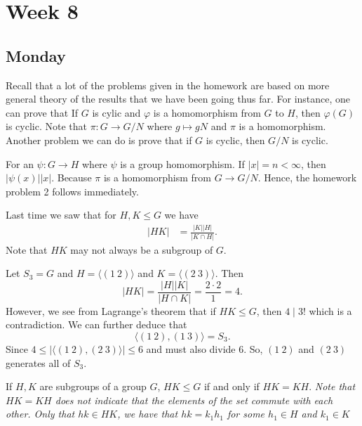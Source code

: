 \section{Week 8}

\subsection{Monday}

Recall that a lot of the problems given in the homework are based on more general theory of the results that we have been going thus far. For instance, one can prove that 
If \( G  \) is cylic and \( \varphi  \) is a homomorphism from \( G  \) to \( H  \), then \( \varphi(G)  \) is cyclic. Note that \( \pi : G \to G / N  \) where \( g \mapsto gN \)   and \( \pi  \) is a homomorphism. Another problem we can do is prove that if \( G  \) is cyclic, then \( G / N  \) is cyclic. 

For an \( \psi  : G \to H  \) where \( \psi  \) is a group homomorphism. If \( | x  |  =  n < \infty   \), then \( | \psi(x)  | | x  |  \). Because \( \pi  \) is a homomorphism from \( G \to G / N  \). Hence, the homework problem 2 follows immediately.

Last time we saw that for \( H , K \leq G  \) we have 
\begin{align*}
    | H K  |  &= \frac{ | K  |  | H  |  }{  | K \cap  H |  }.
\end{align*}
Note that \( HK  \) may not always be a subgroup of \( G  \).

\begin{eg}
   Let \( {S}_{3} = G  \) and \( H = \langle (1 \ 2) \rangle \) and \( K = \langle  (2 \ 3) \rangle \). Then 
   \[  | H K |  = \frac{ | H  |  | K  |   }{ | H \cap K  |  }  = \frac{ 2 \cdot 2  }{ 1  }  = 4.  \]
   However, we see from Lagrange's theorem that if \( H K \leq G  \), then \( 4 \mid 3!  \) which is a contradiction. We can further deduce that 
   \[  \langle (1  \ 2 )  , (1 \  3) \rangle = {S}_{3}. \]
   Since \( 4 \leq | \langle (1  \  2 ) , (2 \ 3) \rangle | \leq 6  \) and must also divide \( 6  \). So, \( (1 \ 2) \) and \( (2 \ 3 ) \) generates all of \( {S}_{3} \).
\end{eg}

\begin{prop}
   If \( H, K  \) are subgroups of a group \( G  \), \( H K \leq G  \) if and only if \( HK =KH  \).
   \textit{Note that \( HK = KH  \) does not indicate that the elements of the set commute with each other. Only that \( h k  \in H K \), we have that \( h k = {k }_{1} {h}_{1}  \) for some \( {h}_{1} \in H  \) and \( {k}_{1} \in K  \)} 
\end{prop}

